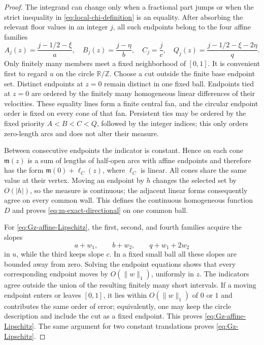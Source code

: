 \documentclass[11pt,reqno,letterpaper]{amsart}
\numberwithin{equation}{section}
\theoremstyle{definition}
\theoremstyle{remark}
\begin{document}
\begin{proof}
The integrand can change only when a fractional part jumps or when the
strict inequality in \eqref{eq:local-chi-definition} is an equality.
After absorbing the relevant floor values in an integer \(j\), all such
endpoints belong to the four affine families
\begin{equation}\label{eq:four-endpoint-families}
 A_j(z)=\frac{j-1/2-\xi}{a},\quad
 B_j(z)=\frac{j-\eta}{b},\quad
 C_j=\frac jc,\quad
 Q_j(z)=\frac{j-1/2-\xi-2\eta}{q}.
\end{equation}
Only finitely many members meet a fixed neighborhood of \([0,1]\).
It is convenient first to regard \(u\) on the circle
\(\mathbb R/\mathbb Z\).  Choose a cut outside the finite base endpoint
set.  Distinct endpoints at \(z=0\) remain distinct in one fixed ball.
Endpoints tied at \(z=0\) are ordered by the finitely many homogeneous
linear differences of their velocities.  These equality lines form a
finite central fan, and the circular endpoint order is fixed on every
cone of that fan.  Persistent ties may be ordered by the fixed priority
\(A<B<C<Q\), followed by the integer indices; this only orders
zero-length arcs and does not alter their measure.

Between consecutive endpoints the indicator is constant.  Hence on
each cone \(\mathfrak m(z)\) is a sum of lengths of half-open arcs with
affine endpoints and therefore has the form
\(\mathfrak m(0)+\ell_C(z)\), where \(\ell_C\) is linear.  All cones
share the same value at their vertex.  Moving an endpoint by \(h\)
changes the selected set by \(O(|h|)\), so the measure is continuous;
the adjacent linear forms consequently agree on every common wall.
This defines the continuous homogeneous function \(D\) and proves
\eqref{eq:m-exact-directional} on one common ball.

For \eqref{eq:Gz-affine-Lipschitz}, the first, second, and fourth
families acquire the slopes
\[
 a+w_1,\qquad b+w_2,\qquad q+w_1+2w_2
\]
in \(u\), while the third keeps slope \(c\).  In a fixed small ball all
these slopes are bounded away from zero.  Solving the endpoint equations
shows that every corresponding endpoint moves by \(O(\|w\|_1)\),
uniformly in \(z\).  The indicators agree outside the union of the
resulting finitely many short intervals.  If a moving endpoint enters or
leaves \([0,1]\), it lies within \(O(\|w\|_1)\) of \(0\) or \(1\) and
contributes the same order of error; equivalently, one may keep the
circle description and include the cut as a fixed endpoint.  This proves
\eqref{eq:Gz-affine-Lipschitz}.  The same argument for two constant
translations proves \eqref{eq:Gz-Lipschitz}.
\end{proof}
\end{document}
